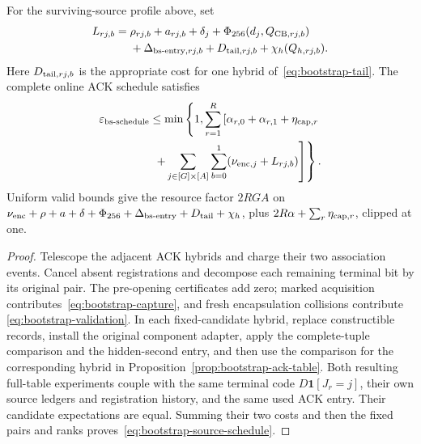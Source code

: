 \begin{theorem}
\label{thm:bootstrap-source-schedule}
For the surviving-source profile above, set
\[
 \begin{split}
 L_{rj,b}={}&\rho_{rj,b}+a_{rj,b}+\delta_j
       +\Phi_{256}(d_j,Q_{{\rm CB},rj,b})\\
       &+\Delta_{{\rm bs\text{-}entry},rj,b}
        +D_{{\rm tail},rj,b}+\chi_h(Q_{h,rj,b}).
 \end{split}
\]
Here $D_{{\rm tail},rj,b}$ is the appropriate cost for one hybrid
of~\eqref{eq:bootstrap-tail}. The complete online ACK schedule satisfies
\begin{equation}
 \begin{split}
 \varepsilon_{\rm bs\text{-}schedule}\le\min\left\{1,
 \sum_{r=1}^{R}\left[
       \alpha_{r,0}+\alpha_{r,1}+\eta_{{\rm cap},r}\right.\right.\\
 \left.\left.\hspace{16mm}
       +\sum_{j\in[G]\times[A]}\sum_{b=0}^{1}
              (\nu_{{\rm enc},j}+L_{rj,b})\right]\right\}.
 \end{split}
 \label{eq:bootstrap-source-schedule}
\end{equation}
Uniform valid bounds give the resource factor $2RGA$ on
$\nu_{\rm enc}+\rho+a+\delta+\Phi_{256}
 +\Delta_{\rm bs\text{-}entry}+D_{\rm tail}+\chi_h$,
plus $2R\alpha+\sum_r\eta_{{\rm cap},r}$, clipped at one.
\end{theorem}
\begin{proof}
Telescope the adjacent ACK hybrids and charge their two association
events. Cancel absent registrations and decompose each remaining
terminal bit by its original pair. The pre-opening certificates add
zero; marked acquisition contributes~\eqref{eq:bootstrap-capture},
and fresh encapsulation collisions contribute
\eqref{eq:bootstrap-validation}. In each fixed-candidate hybrid,
replace constructible records, install the original component adapter,
apply the complete-tuple comparison and the hidden-second entry, and
then use the comparison for the corresponding hybrid in
Proposition~\ref{prop:bootstrap-ack-table}.
Both resulting full-table experiments couple with the same terminal
code $D\mathbf1[J_r=j]$, their own source ledgers and registration
history, and the same used ACK entry. Their candidate expectations
are equal. Summing their two costs and then the fixed pairs and ranks
proves~\eqref{eq:bootstrap-source-schedule}.
\end{proof}


